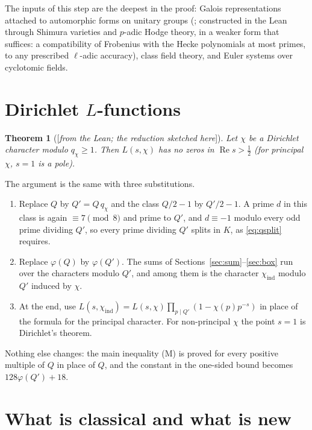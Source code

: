 \documentclass[11pt]{amsart}
\numberwithin{equation}{section}
\newtheorem{theorem}{Theorem}[section]
\theoremstyle{definition}
\theoremstyle{remark}
\newcommand{\re}{\operatorname{Re}}
\newcommand{\status}[1]{\textup{[\emph{#1}]}}
\begin{document}
The inputs of this step are the deepest in the proof: Galois representations attached to automorphic forms on unitary groups (\cite{shin,CH}; constructed in the Lean through Shimura varieties and $p$-adic Hodge theory, in a weaker form that suffices: a compatibility of Frobenius with the Hecke polynomials at most primes, to any prescribed $\ell$-adic accuracy), class field theory, and Euler systems over cyclotomic fields.

\section{Dirichlet $L$-functions}\label{sec:dirichlet}

\begin{theorem}[\status{from the Lean; the reduction sketched here}]
Let $\chi$ be a Dirichlet character modulo $q_\chi\ge1$. Then $L(s,\chi)$ has no zeros in $\re s>\frac12$ (for principal $\chi$, $s=1$ is a pole).
\end{theorem}

The argument is the same with three substitutions.
\begin{enumerate}[leftmargin=2em]
\item Replace $Q$ by $Q'=Q\,q_\chi$ and the class $Q/2-1$ by $Q'/2-1$. A prime $d$ in this class is again $\equiv7\pmod8$ and prime to $Q'$, and $d\equiv-1$ modulo every odd prime dividing $Q'$, so every prime dividing $Q'$ splits in $K$, as \eqref{eq:qsplit} requires.
\item Replace $\varphi(Q)$ by $\varphi(Q')$. The sums of Sections~\ref{sec:sum}--\ref{sec:box} run over the characters modulo $Q'$, and among them is the character $\chi_{\mathrm{ind}}$ modulo $Q'$ induced by $\chi$.
\item At the end, use $L(s,\chi_{\mathrm{ind}})=L(s,\chi)\prod_{p\mid Q'}(1-\chi(p)p^{-s})$ in place of the formula for the principal character. For non-principal $\chi$ the point $s=1$ is Dirichlet's theorem.
\end{enumerate}
Nothing else changes: the main inequality (M) is proved for every positive multiple of $Q$ in place of $Q$, and the constant in the one-sided bound becomes $128\varphi(Q')+18$.

\section*{What is classical and what is new}
\end{document}
